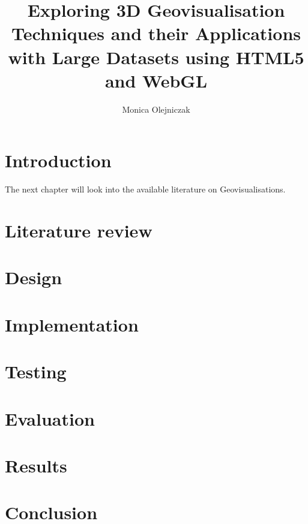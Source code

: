 \documentclass[
	paper=A4,
    titlepage=true,
	fontsize=11pt,
	parskip=half
]{scrreprt}
\title{Exploring 3D Geovisualisation Techniques and their Applications with Large Datasets using HTML5 and WebGL}
\author{Monica Olejniczak}
\begin{document}
	

	\setcounter{page}{1}
	
	\chapter{Introduction} {
	\label{ch:introduction}
		
	}

	The next chapter will look into the available literature on Geovisualisations.

	\chapter{Literature review} {
	\label{ch:literature_review}
		
	}
	
	\chapter{Design} {
	\label{ch:design}
			
	}
	
	\chapter{Implementation} {
	\label{ch:implementation}
		
	}

	\chapter{Testing} {
	\label{ch:testing}
		
	}

	\chapter{Evaluation} {
	\label{ch:evaluation}
		
	}

	\chapter{Results} {
	\label{ch:results}
		
	}

	\chapter{Conclusion} {
	\label{ch:conclusion}
		
	}
	
	\renewcommand{\bibname}{References}
	\printbibliography[notcategory=exclude]
	
\end{document}
